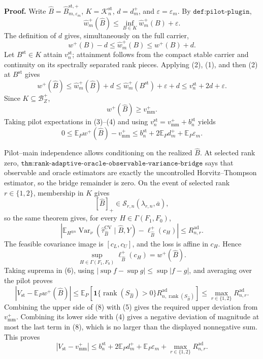 \textbf{Proof.}
Write \(\widehat B=\widehat B_{m,\varepsilon_m}^{\mathrm{st},+}\), \(K=\mathcal K_n^{\mathrm{st}}\), \(d=d_m^+\), and \(\varepsilon=\varepsilon_m\).  By \(\texttt{def:pilot-plugin}\),
\[
\widehat w_m^+(\widehat B)
\le\inf_{B\in K}\widehat w_m^+(B)+\varepsilon.
\tag{1}
\]
The definition of \(d\) gives, simultaneously on the full carrier,
\[
w^+(B)-d\le\widehat w_m^+(B)\le w^+(B)+d.
\tag{2}
\]
Let \(B^{\mathrm{st}}\in K\) attain \(v_n^{\mathrm{st}}\); attainment follows from the compact stable carrier and continuity on its spectrally separated rank pieces.  Applying (2), (1), and then (2) at \(B^{\mathrm{st}}\) gives
\[
w^+(\widehat B)
\le\widehat w_m^+(\widehat B)+d
\le\widehat w_m^+(B^{\mathrm{st}})+\varepsilon+d
\le v_n^{\mathrm{st}}+2d+\varepsilon.
\tag{3}
\]
Since \(K\subseteq\mathcal B_Z^+\),
\[
w^+(\widehat B)\ge v_{\mathrm{mm}}^+.
\tag{4}
\]
Taking pilot expectations in (3)--(4) and using \(v_n^{\mathrm{st}}=v_{\mathrm{mm}}^++b_n^{\mathrm{st}}\) yields
\[
0\le\mathbb E_Pw^+(\widehat B)-v_{\mathrm{mm}}^+
\le b_n^{\mathrm{st}}+2\mathbb E_Pd_m^++\mathbb E_P\varepsilon_m.
\tag{5}
\]

Pilot--main independence allows conditioning on the realized \(\widehat B\).  At selected rank zero, \(\texttt{thm:rank-adaptive-oracle-observable-variance-bridge}\) says that observable and oracle estimators are exactly the uncontrolled Horvitz--Thompson estimator, so the bridge remainder is zero.  On the event of selected rank \(r\in\{1,2\}\), membership in \(K\) gives
\[
[\widehat B]_+\in\mathcal S_{r,n}(\lambda_{r,n},\overline a),
\]
so the same theorem gives, for every \(H\in\Gamma(F_1,F_0)\),
\[
\left|
\mathbb E_{H^{\otimes n}}
\operatorname{Var}_\nu(\widehat\tau_{\widehat B}^{\mathrm{CV}}\mid\widehat B,Y)
-\ell_{\widehat B}^+(c_H)\right|
\le R_{n,r}^{\mathrm{ad}}.
\tag{6}
\]
The feasible covariance image is \([c_L,c_U]\), and the loss is affine in \(c_H\).  Hence
\[
\sup_{H\in\Gamma(F_1,F_0)}\ell_{\widehat B}^+(c_H)
=w^+(\widehat B).
\tag{7}
\]
Taking suprema in (6), using \(|\sup f-\sup g|\le\sup|f-g|\), and averaging over the pilot proves
\[
\left|V_{\mathrm{st}}-\mathbb E_Pw^+(\widehat B)\right|
\le\mathbb E_P\!\left[
\mathbf1\{\operatorname{rank}(S_{\widehat B})>0\}
R_{n,\operatorname{rank}(S_{\widehat B})}^{\mathrm{ad}}\right]
\le\max_{r\in\{1,2\}}R_{n,r}^{\mathrm{ad}}.
\tag{8}
\]
Combining the upper side of (8) with (5) gives the required upper deviation from \(v_{\mathrm{mm}}^+\).  Combining its lower side with (4) gives a negative deviation of magnitude at most the last term in (8), which is no larger than the displayed nonnegative sum.  This proves
\[
\left|V_{\mathrm{st}}-v_{\mathrm{mm}}^+\right|
\le b_n^{\mathrm{st}}+2\mathbb E_Pd_m^+
+\mathbb E_P\varepsilon_m
+\max_{r\in\{1,2\}}R_{n,r}^{\mathrm{ad}}.
\tag{9}
\]


